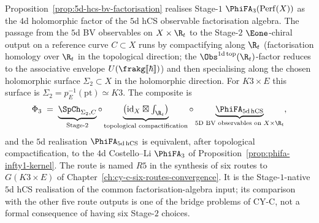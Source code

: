 \begin{remark}
\label{rem:r5-stable-chiral-voa-realisation}
Proposition~\ref{prop:5d-hcs-bv-factorisation} realises Stage-$1$ $\PhiFA_3(\mathrm{Perf}(X))$ as the $4$d holomorphic factor of the $5$d hCS observable factorisation algebra. The passage from the $5$d BV observables on $X \times \R_t$ to the Stage-$2$ $\Eone$-chiral output on a reference curve $C \subset X$ runs by compactifying along $\R_t$ (factorisation homology over $\R_t$ in the topological direction; the $\Obs^{1\mathrm{d\,top}}(\R_t)$-factor reduces to the associative envelope $U(\frakg[\![\hbar]\!])$) and then specialising along the chosen holomorphic surface $\Sigma_2\subset X$ in the holomorphic direction. For $K3\times E$ this surface is $\Sigma_2=p_E^{-1}(\mathrm{pt})\simeq K3$. The composite is
\[
 \Phi_3 \;=\; \underbrace{\SpCh_{\Sigma_2, C}}_{\text{Stage-}2} \circ \underbrace{\bigl(\mathrm{id}_X \boxtimes \textstyle\int_{\R_t}\bigr)}_{\text{topological compactification}} \circ \underbrace{\PhiFA_{5\mathrm{d\,hCS}}}_{\text{5D BV observables on } X \times \R_t},
\]
and the $5$d realisation $\PhiFA_{5\mathrm{d\,hCS}}$ is equivalent, after topological compactification, to the $4$d Costello--Li $\PhiFA_3$ of Proposition~\ref{prop:phifa-infty1-kernel}. The route is named \(R5\) in the synthesis of six routes to \(G(K3 \times E)\) of Chapter~\ref{ch:cy-c-six-routes-convergence}. It is the Stage-\(1\)-native \(5\)d hCS realisation of the common factorisation-algebra input; its comparison with the other five route outputs is one of the bridge problems of CY-C, not a formal consequence of having six Stage-\(2\) choices.
\end{remark}

